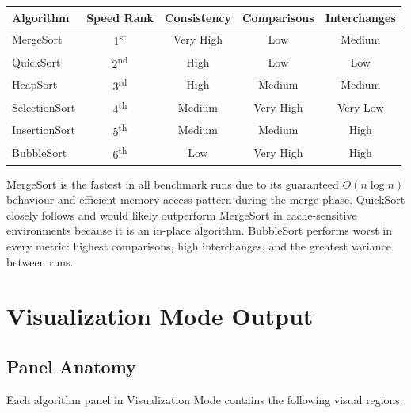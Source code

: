\documentclass[12pt,a4paper]{article}
\begin{document}
\begin{center}
\begin{tabular}{lcccc}
\toprule
\textbf{Algorithm} & \textbf{Speed Rank} & \textbf{Consistency} &
\textbf{Comparisons} & \textbf{Interchanges} \\
\midrule
MergeSort     & 1\textsuperscript{st} & Very High & Low     & Medium \\
QuickSort     & 2\textsuperscript{nd} & High      & Low     & Low    \\
HeapSort      & 3\textsuperscript{rd} & High      & Medium  & Medium \\
SelectionSort & 4\textsuperscript{th} & Medium    & Very High & Very Low \\
InsertionSort & 5\textsuperscript{th} & Medium    & Medium  & High   \\
BubbleSort    & 6\textsuperscript{th} & Low       & Very High & High   \\
\bottomrule
\end{tabular}
\end{center}

MergeSort is the fastest in all benchmark runs due to its guaranteed
$O(n \log n)$ behaviour and efficient memory access pattern during the merge
phase. QuickSort closely follows and would likely outperform MergeSort in
cache-sensitive environments because it is an in-place algorithm. BubbleSort
performs worst in every metric: highest comparisons, high interchanges, and
the greatest variance between runs.

\section{Visualization Mode Output}

\subsection{Panel Anatomy}

Each algorithm panel in Visualization Mode contains the following visual regions:
\end{document}
